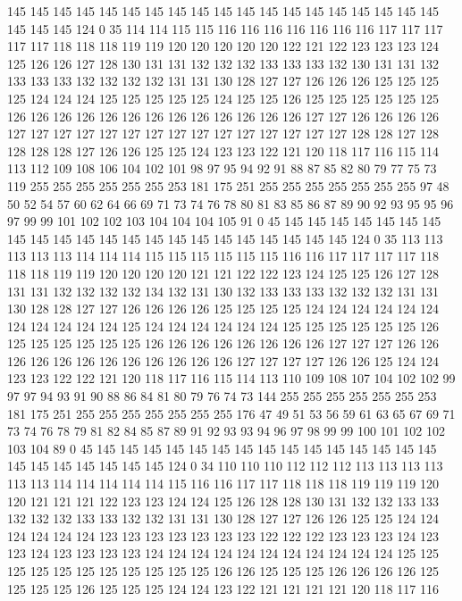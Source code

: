 145 145 145 145 145 145 145 145 145 145 145 145 145 145 145 145 145 145 145 145
145 145 124 0 35 114 114 115 115 116 116 116 116 116 116 116 117 117 117 117
117 118 118 118 119 119 120 120 120 120 120 122 121 122 123 123 123 124 125 126
126 127 128 130 131 131 132 132 132 133 133 133 132 130 131 131 132 133 133 133
132 132 132 132 131 131 130 128 127 127 126 126 126 125 125 125 125 124 124 124
125 125 125 125 125 124 125 125 126 125 125 125 125 125 125 126 126 126 126 126
126 126 126 126 126 126 126 126 127 127 126 126 126 126 127 127 127 127 127 127
127 127 127 127 127 127 127 127 127 128 128 127 128 128 128 128 127 126 126 125
125 124 123 123 122 121 120 118 117 116 115 114 113 112 109 108 106 104 102 101
98 97 95 94 92 91 88 87 85 82 80 79 77 75 73 119 255 255 255 255
255 255 253 181 175 251 255 255 255 255 255 255 255 97 48 50 52 54 57 60
62 64 66 69 71 73 74 76 78 80 81 83 85 86 87 89 90 92 93 95
95 96 97 99 99 101 102 102 103 104 104 104 105 91 0 45 145 145 145 145
145 145 145 145 145 145 145 145 145 145 145 145 145 145 145 145 145 145 124 0
35 113 113 113 113 113 114 114 114 115 115 115 115 115 115 116 116 117 117 117
117 118 118 118 119 119 120 120 120 120 121 121 122 122 123 124 125 125 126 127
128 131 131 132 132 132 132 134 132 131 130 132 133 133 133 132 132 132 131 131
130 128 128 127 127 126 126 126 126 125 125 125 125 124 124 124 124 124 124 124
124 124 124 124 125 124 124 124 124 124 124 125 125 125 125 125 125 126 125 125
125 125 125 125 126 126 126 126 126 126 126 126 127 127 127 126 126 126 126 126
126 126 126 126 126 126 126 127 127 127 127 126 126 125 124 124 123 123 122 122
121 120 118 117 116 115 114 113 110 109 108 107 104 102 102 99 97 97 94 93
91 90 88 86 84 81 80 79 76 74 73 144 255 255 255 255 255 255 253 181
175 251 255 255 255 255 255 255 255 176 47 49 51 53 56 59 61 63 65 67
69 71 73 74 76 78 79 81 82 84 85 87 89 91 92 93 93 94 96 97
98 99 99 100 101 102 102 103 104 89 0 45 145 145 145 145 145 145 145 145
145 145 145 145 145 145 145 145 145 145 145 145 145 145 124 0 34 110 110 110
112 112 112 113 113 113 113 113 113 114 114 114 114 114 115 116 116 117 117 118
118 118 119 119 119 120 120 121 121 121 122 123 123 124 124 125 126 128 128 130
131 132 132 133 133 132 132 132 133 133 132 132 131 131 130 128 127 127 126 126
125 125 124 124 124 124 124 124 123 123 123 123 123 123 123 122 122 122 123 123
123 124 123 123 124 123 123 123 123 124 124 124 124 124 124 124 124 124 124 124
125 125 125 125 125 125 125 125 125 125 125 126 126 125 125 125 126 126 126 126
125 125 125 125 126 125 125 125 124 124 123 122 121 121 121 121 120 118 117 116
